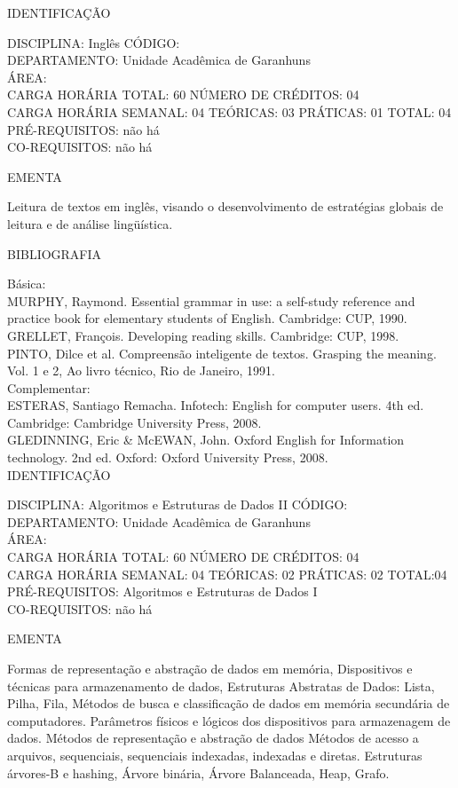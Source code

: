 \documentclass[
	12pt,				%
	openright,			%
  oneside,     %
	a4paper,			%
	english,			%
	french,				%
	spanish,			%
	brazil				%
	]{abntex2}
\begin{document}
\begin{apendicesenv}
\newpage IDENTIFICAÇÃO

DISCIPLINA: Inglês CÓDIGO:\\ 
DEPARTAMENTO: Unidade Acadêmica de Garanhuns\\
ÁREA: \\
CARGA HORÁRIA TOTAL: 60 NÚMERO DE CRÉDITOS: 04\\
CARGA HORÁRIA SEMANAL: 04 TEÓRICAS: 03 PRÁTICAS: 01 TOTAL: 04\\
PRÉ-REQUISITOS: não há\\
CO-REQUISITOS: não há

EMENTA 

Leitura de textos em inglês, visando o desenvolvimento de estratégias
globais de leitura e de análise lingüística.

BIBLIOGRAFIA 

Básica:\\
MURPHY, Raymond. Essential grammar in use: a self-study reference and
practice book for elementary students of English. Cambridge: CUP, 1990.\\
GRELLET, François. Developing reading skills. Cambridge: CUP, 1998.\\
PINTO, Dilce et al. Compreensão inteligente de textos. Grasping the
meaning. Vol. 1 e 2, Ao livro técnico, Rio de Janeiro, 1991.\\
Complementar:\\
ESTERAS, Santiago Remacha. Infotech: English for computer users. 4th ed.
Cambridge: Cambridge University Press, 2008.\\
GLEDINNING, Eric \& McEWAN, John. Oxford English for Information
technology. 2nd ed. Oxford: Oxford University Press, 2008.\\


\newpage IDENTIFICAÇÃO

DISCIPLINA: Algoritmos e Estruturas de Dados II CÓDIGO:\\ 
DEPARTAMENTO: Unidade Acadêmica de Garanhuns\\
ÁREA: \\
CARGA HORÁRIA TOTAL: 60 NÚMERO DE CRÉDITOS: 04\\
CARGA HORÁRIA SEMANAL: 04 TEÓRICAS: 02 PRÁTICAS: 02 TOTAL:04\\
PRÉ-REQUISITOS: Algoritmos e Estruturas de Dados I\\
CO-REQUISITOS: não há

EMENTA 

Formas de representação e abstração de dados em memória, Dispositivos e técnicas para armazenamento de dados, Estruturas Abstratas de Dados:  Lista, Pilha, Fila, Métodos de busca e classificação de dados em memória secundária de computadores. Parâmetros físicos e lógicos dos dispositivos para armazenagem de dados. Métodos de representação e abstração de dados Métodos de acesso a arquivos, sequenciais, sequenciais indexadas,  indexadas e diretas. Estruturas árvores-B e  hashing, Árvore binária, Árvore Balanceada, Heap, Grafo.


\end{apendicesenv}
\end{document}
